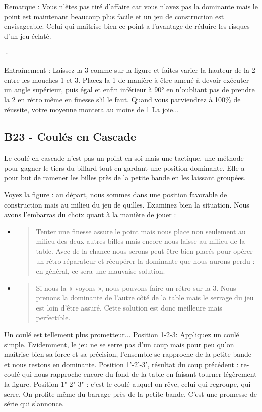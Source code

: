 Remarque : Vous n'êtes pas tiré d'affaire car vous n'avez pas la
dominante mais le point est maintenant beaucoup plus facile et un jeu de
construction est envisageable. Celui qui maîtrise bien ce point a
l'avantage de réduire les risques d'un jeu éclaté.

·

Entraînement : Laissez la 3 comme sur la figure et faites varier la
hauteur de la 2 entre les mouches 1 et 3. Placez la 1 de manière à être
amené à devoir exécuter un angle supérieur, puis égal et enfin inférieur
à 90° en n'oubliant pas de prendre la 2 en rétro même en finesse s'il le
faut. Quand vous parviendrez à 100\% de réussite, votre moyenne montera
au moins de 1 La joie...

\subsection{B23 - Coulés en Cascade}\label{b23---couluxe9s-en-cascade}

Le coulé en cascade n'est pas un point en soi mais une tactique, une
méthode pour gagner le tiers du billard tout en gardant une position
dominante. Elle a pour but de ramener les billes près de la petite bande
en les laissant groupées.

Voyez la figure : au départ, nous sommes dans une position favorable de
construction mais au milieu du jeu de quilles. Examinez bien la
situation. Nous avons l'embarras du choix quant à la manière de jouer :

\begin{itemize}
\item
  \begin{quote}
  Tenter une finesse assure le point mais nous place non seulement au
  milieu des deux autres billes mais encore nous laisse au milieu de la
  table. Avec de la chance nous serons peut-être bien placés pour opérer
  un rétro réparateur et récupérer la dominante que nous aurons perdu :
  en général, ce sera une mauvaise solution.
  \end{quote}
\item
  \begin{quote}
  Si nous la « voyons », nous pouvons faire un rétro sur la 3. Nous
  prenons la dominante de l'autre côté de la table mais le serrage du
  jeu est loin d'être assuré. Cette solution est donc meilleure mais
  perfectible.
  \end{quote}
\end{itemize}

Un coulé est tellement plus prometteur... Position 1-2-3: Appliquez un
coulé simple. Evidemment, le jeu ne se serre pas d'un coup mais pour peu
qu'on maîtrise bien sa force et sa précision, l'ensemble se rapproche de
la petite bande et nous restons en dominante. Position 1'-2'-3',
résultat du coup précédent : re-coulé qui nous rapproche encore du fond
de la table en faisant tourner légèrement la figure. Position 1"-2"-3" :
c'est le coulé auquel on rêve, celui qui regroupe, qui serre. On profite
même du barrage près de la petite bande. C'est une promesse de série qui
s'annonce.

